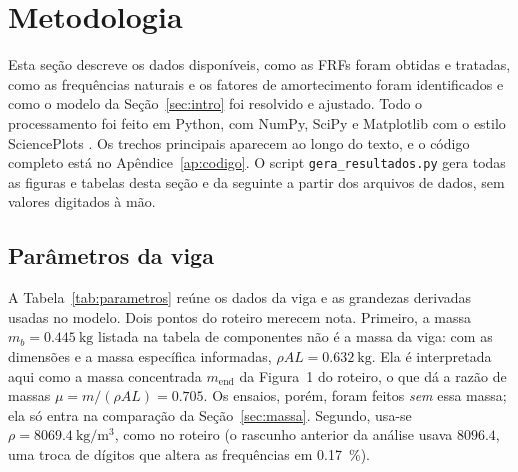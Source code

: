 \section{Metodologia}
\label{sec:metodologia}

Esta seção descreve os dados disponíveis, como as FRFs foram obtidas e tratadas, como
as frequências naturais e os fatores de amortecimento foram identificados e como o
modelo da Seção~\ref{sec:intro} foi resolvido e ajustado. Todo o processamento foi
feito em Python, com NumPy, SciPy \cite{scipy2020} e Matplotlib com o estilo
SciencePlots \cite{scienceplots}. Os trechos principais aparecem ao longo do texto, e o
código completo está no Apêndice~\ref{ap:codigo}. O script
\texttt{gera\_resultados.py} gera todas as figuras e tabelas desta seção e da seguinte
a partir dos arquivos de dados, sem valores digitados à mão.

\subsection{Parâmetros da viga}
\label{sec:parametros}

A Tabela~\ref{tab:parametros} reúne os dados da viga \cite{roteiroLab1} e as
grandezas derivadas usadas no modelo. Dois pontos do roteiro merecem nota. Primeiro,
a massa $m_b = \SI{0.445}{\kilo\gram}$ listada na tabela de componentes não é a
massa da viga: com as dimensões e a massa específica informadas,
$\rho A L = \SI{0.632}{\kilo\gram}$. Ela é interpretada aqui como a massa
concentrada $m_{\mathrm{end}}$ da Figura~1 do roteiro, o que dá a razão de massas
$\mu = m/(\rho A L) = \num{0.705}$. Os ensaios, porém, foram feitos \emph{sem} essa
massa; ela só entra na comparação da Seção~\ref{sec:massa}. Segundo, usa-se
$\rho = \SI{8069.4}{\kilo\gram\per\cubic\meter}$, como no roteiro (o rascunho anterior
da análise usava $\num{8096.4}$, uma troca de dígitos que altera as frequências em
\SI{0.17}{\percent}).

